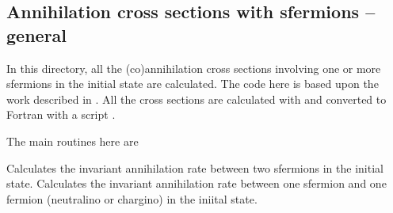 
\subsection{Annihilation cross sections with sfermions -- general }

In this directory, all the (co)annihilation cross sections involving
one or more sfermions in the initial state are calculated. The code
here is based upon the work described in \cite{Edsjo:2003us}. All the cross
sections are calculated with  and converted to Fortran with
a script  \cite{form2f}. 

The main routines here are

\begin{brief-subs}
  Calculates the invariant annihilation rate between two sfermions in
  the initial state.
  Calculates the invariant annihilation rate between one sfermion and
  one fermion (neutralino or chargino) in the iniital state.
\end{brief-subs}

